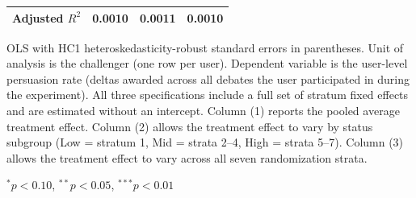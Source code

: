 \begin{table}[htbp]
\begin{threeparttable}
\begin{tabular}{lccc}
Adjusted $R^2$       & 0.0010 & 0.0011 & 0.0010 \\
\bottomrule
\end{tabular}
\begin{tablenotes}
\footnotesize
\item[] OLS with HC1 heteroskedasticity-robust standard errors in parentheses. Unit of analysis is the challenger (one row per user). Dependent variable is the user-level persuasion rate (deltas awarded across all debates the user participated in during the experiment). All three specifications include a full set of stratum fixed effects and are estimated without an intercept. Column (1) reports the pooled average treatment effect. Column (2) allows the treatment effect to vary by status subgroup (Low = stratum 1, Mid = strata 2--4, High = strata 5--7). Column (3) allows the treatment effect to vary across all seven randomization strata.
\item[] $^{*}p < 0.10$, $^{**}p < 0.05$, $^{***}p < 0.01$
\end{tablenotes}
\end{threeparttable}
\end{table}